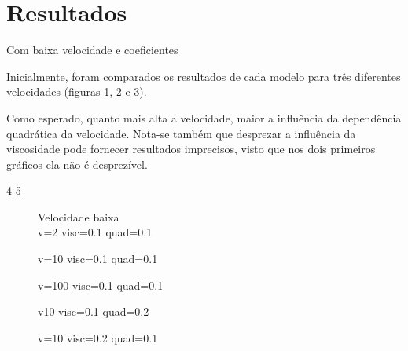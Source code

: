 \section{Resultados}
Com baixa velocidade e coeficientes 

Inicialmente, foram comparados os resultados de cada modelo para três diferentes velocidades (figuras
\ref{v2-visc0.1-quad0.1.eps},
\ref{v10-visc0.1-quad0.1.eps} e
\ref{v100-visc0.1-quad0.1.eps}).

Como esperado, quanto mais alta a velocidade, maior a influência da dependência quadrática da velocidade.
Nota-se também que desprezar a influência da viscosidade pode fornecer resultados imprecisos, visto que nos dois primeiros gráficos ela não é desprezível.

\ref{v10-visc0.1-quad0.2.eps}
\ref{v10-visc0.2-quad0.1.eps}

\begin{figure}[htbp!]
  \caption{Velocidade baixa \\ v=2 visc=0.1 quad=0.1}
  \label{v2-visc0.1-quad0.1.eps}
  \centering
\end{figure}

\begin{figure}[htbp!]
  \caption{v=10 visc=0.1 quad=0.1}
  \label{v10-visc0.1-quad0.1.eps}
  \centering
\end{figure}

\begin{figure}[htbp!]
  \caption{v=100 visc=0.1 quad=0.1}
  \label{v100-visc0.1-quad0.1.eps}
  \centering
\end{figure}

\begin{figure}[htbp!]
  \caption{v10 visc=0.1 quad=0.2}
  \label{v10-visc0.1-quad0.2.eps}
  \centering
\end{figure}

\begin{figure}[htbp!]
  \caption{v=10 visc=0.2 quad=0.1}
  \label{v10-visc0.2-quad0.1.eps}
  \centering
\end{figure}


